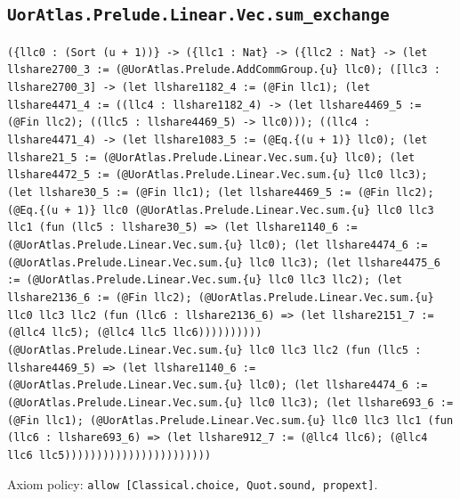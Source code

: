 \documentclass[11pt]{article}
\begin{document}
\subsection*{\texttt{UorAtlas.Prelude.Linear.Vec.sum\_exchange}}
\noindent\texttt{(\{llc0 : (Sort (u + 1))\} -> (\{llc1 : Nat\} -> (\{llc2 : Nat\} -> (let llshare2700\_3 := (@UorAtlas.Prelude.AddCommGroup.\{u\} llc0); ([llc3 : llshare2700\_3] -> (let llshare1182\_4 := (@Fin llc1); (let llshare4471\_4 := ((llc4 : llshare1182\_4) -> (let llshare4469\_5 := (@Fin llc2); ((llc5 : llshare4469\_5) -> llc0))); ((llc4 : llshare4471\_4) -> (let llshare1083\_5 := (@Eq.\{(u + 1)\} llc0); (let llshare21\_5 := (@UorAtlas.Prelude.Linear.Vec.sum.\{u\} llc0); (let llshare4472\_5 := (@UorAtlas.Prelude.Linear.Vec.sum.\{u\} llc0 llc3); (let llshare30\_5 := (@Fin llc1); (let llshare4469\_5 := (@Fin llc2); (@Eq.\{(u + 1)\} llc0 (@UorAtlas.Prelude.Linear.Vec.sum.\{u\} llc0 llc3 llc1 (fun (llc5 : llshare30\_5) => (let llshare1140\_6 := (@UorAtlas.Prelude.Linear.Vec.sum.\{u\} llc0); (let llshare4474\_6 := (@UorAtlas.Prelude.Linear.Vec.sum.\{u\} llc0 llc3); (let llshare4475\_6 := (@UorAtlas.Prelude.Linear.Vec.sum.\{u\} llc0 llc3 llc2); (let llshare2136\_6 := (@Fin llc2); (@UorAtlas.Prelude.Linear.Vec.sum.\{u\} llc0 llc3 llc2 (fun (llc6 : llshare2136\_6) => (let llshare2151\_7 := (@llc4 llc5); (@llc4 llc5 llc6)))))))))) (@UorAtlas.Prelude.Linear.Vec.sum.\{u\} llc0 llc3 llc2 (fun (llc5 : llshare4469\_5) => (let llshare1140\_6 := (@UorAtlas.Prelude.Linear.Vec.sum.\{u\} llc0); (let llshare4474\_6 := (@UorAtlas.Prelude.Linear.Vec.sum.\{u\} llc0 llc3); (let llshare693\_6 := (@Fin llc1); (@UorAtlas.Prelude.Linear.Vec.sum.\{u\} llc0 llc3 llc1 (fun (llc6 : llshare693\_6) => (let llshare912\_7 := (@llc4 llc6); (@llc4 llc6 llc5)))))))))))))))))))))))}\par
\noindent Axiom policy: \texttt{allow [Classical.choice, Quot.sound, propext]}.\par
\end{document}
